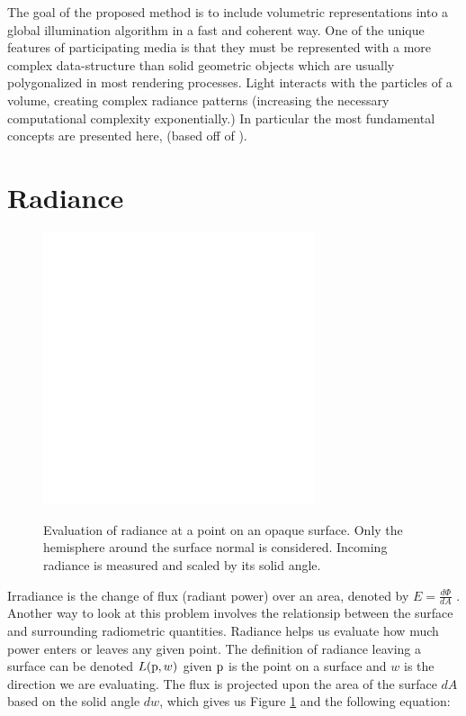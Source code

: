 \documentclass[12pt]{ucthesis}
\newcommand{\captionfonts}{\small\bf\ssp}
\begin{document}
The goal of the proposed method is to include volumetric representations into a global illumination algorithm in a fast and coherent way. One of the unique features of participating media is that they must be represented with a more complex data-structure than solid geometric objects which are usually polygonalized in most rendering processes.  Light interacts with the particles of a volume, creating complex radiance patterns (increasing the necessary computational complexity exponentially.) In particular the most fundamental concepts are presented here,  (based off of  \cite{pbrt}).

\section{Radiance}

\begin{figure}[h!]
    \centering
    \includegraphics[width=80mm]{img/diag/radiance.pdf}
    \captionfonts
    \caption{Evaluation of radiance at a point on an opaque surface.  Only the hemisphere around the surface normal is considered.  Incoming radiance is measured and scaled by its solid angle.}
    \label{fig:radiance}
\end{figure}

Irradiance is the change of flux (radiant power) over an area, denoted by $E = \frac{d\Phi}{dA}$ \cite{aga}. Another way to look at this problem involves the relationsip between the surface and surrounding radiometric quantities.  Radiance helps us evaluate how much power enters or leaves any given point.  The definition of radiance leaving a surface can be denoted $L(\textup{p}, w)$ given $\textup{p}$ is the point on a surface and $w$ is the direction we are evaluating.  The flux is projected upon the area of the surface $dA$ based on the solid angle $dw$, which gives us Figure \ref{fig:radiance} and the following equation:
\end{document}
